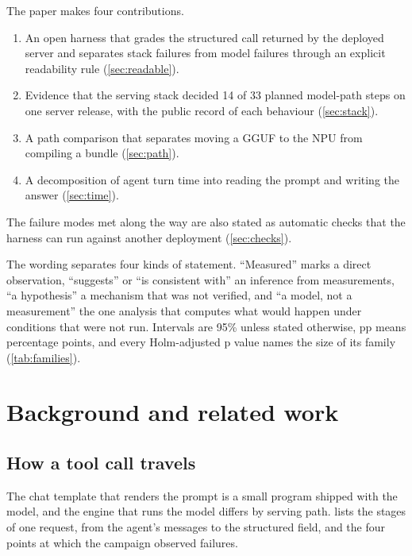 \documentclass[11pt]{article}
\begin{document}
The paper makes four contributions.
\begin{enumerate}
\item An open harness that grades the structured call returned by the deployed server and separates stack failures from model failures through an explicit readability rule (\cref{sec:readable}).
\item Evidence that the serving stack decided 14 of 33 planned model-path steps on one server release, with the public record of each behaviour (\cref{sec:stack}).
\item A path comparison that separates moving a GGUF to the NPU from compiling a bundle (\cref{sec:path}).
\item A decomposition of agent turn time into reading the prompt and writing the answer (\cref{sec:time}).
\end{enumerate}
The failure modes met along the way are also stated as automatic checks that the harness can run against another deployment (\cref{sec:checks}).

The wording separates four kinds of statement. ``Measured'' marks a direct observation, ``suggests'' or ``is consistent with'' an inference from measurements, ``a hypothesis'' a mechanism that was not verified, and ``a model, not a measurement'' the one analysis that computes what would happen under conditions that were not run. Intervals are 95\% unless stated otherwise, pp means percentage points, and every Holm-adjusted p value names the size of its family (\cref{tab:families}).

\section{Background and related work}\label{sec:background}

\subsection{How a tool call travels}\label{sec:travel}

The chat template that renders the prompt is a small program shipped with the model, and the engine that runs the model differs by serving path.  lists the stages of one request, from the agent's messages to the structured field, and the four points at which the campaign observed failures.
\end{document}
